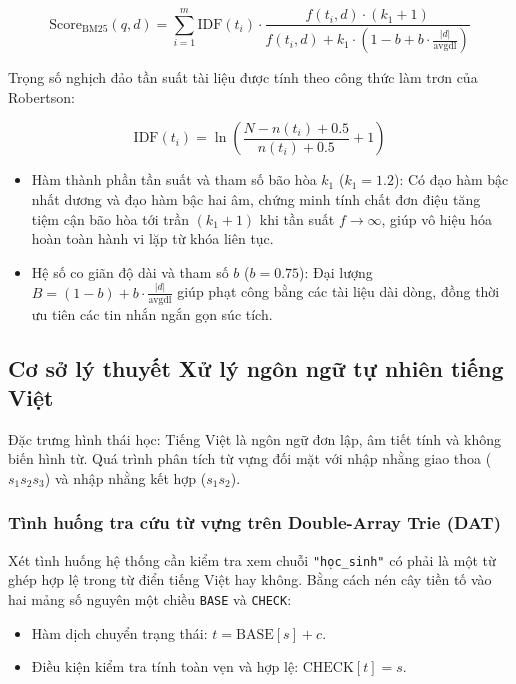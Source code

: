 \documentclass[12pt,a4paper,oneside]{report}
\begin{document}
\begin{equation}
\text{Score}_{\text{BM25}}(q, d) = \sum_{i=1}^{m} \text{IDF}(t_i) \cdot \frac{f(t_i, d) \cdot (k_1 + 1)}{f(t_i, d) + k_1 \cdot \left(1 - b + b \cdot \frac{|d|}{\text{avgdl}}\right)}
\end{equation}

Trọng số nghịch đảo tần suất tài liệu được tính theo công thức làm trơn của Robertson:

\begin{equation}
\text{IDF}(t_i) = \ln \left( \frac{N - n(t_i) + 0.5}{n(t_i) + 0.5} + 1 \right)
\end{equation}

\begin{itemize}
    \item Hàm thành phần tần suất và tham số bão hòa $k_1$ ($k_1 = 1.2$): Có đạo hàm bậc nhất dương và đạo hàm bậc hai âm, chứng minh tính chất đơn điệu tăng tiệm cận bão hòa tới trần $(k_1 + 1)$ khi tần suất $f \to \infty$, giúp vô hiệu hóa hoàn toàn hành vi lặp từ khóa liên tục.
    \item Hệ số co giãn độ dài và tham số $b$ ($b = 0.75$): Đại lượng $B = (1 - b) + b \cdot \frac{|d|}{\text{avgdl}}$ giúp phạt công bằng các tài liệu dài dòng, đồng thời ưu tiên các tin nhắn ngắn gọn súc tích.
\end{itemize}

\subsection{Cơ sở lý thuyết Xử lý ngôn ngữ tự nhiên tiếng Việt}
Đặc trưng hình thái học: Tiếng Việt là ngôn ngữ đơn lập, âm tiết tính và không biến hình từ. Quá trình phân tích từ vựng đối mặt với nhập nhằng giao thoa ($s_1 s_2 s_3$) và nhập nhằng kết hợp ($s_1 s_2$).

\subsubsection{Tình huống tra cứu từ vựng trên Double-Array Trie (DAT)}
Xét tình huống hệ thống cần kiểm tra xem chuỗi \texttt{"học\_sinh"} có phải là một từ ghép hợp lệ trong từ điển tiếng Việt hay không. Bằng cách nén cây tiền tố vào hai mảng số nguyên một chiều \texttt{BASE} và \texttt{CHECK}:
\begin{itemize}
    \item Hàm dịch chuyển trạng thái: $t = \text{BASE}[s] + c$.
    \item Điều kiện kiểm tra tính toàn vẹn và hợp lệ: $\text{CHECK}[t] = s$.
\end{itemize}
\end{document}
